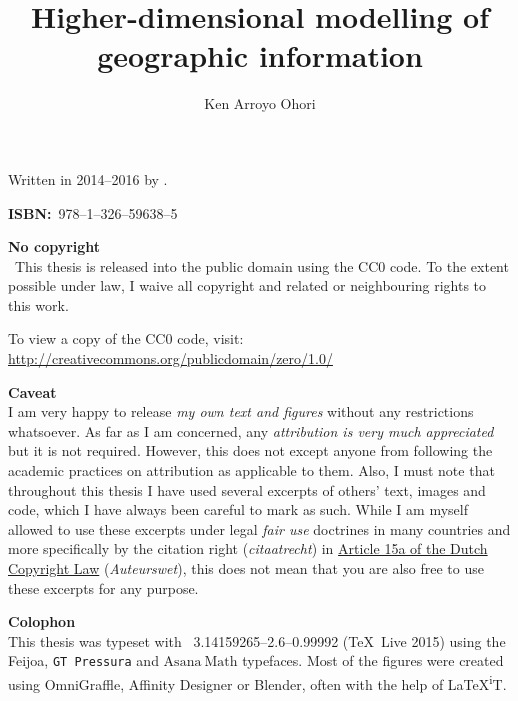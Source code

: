
% 

\author{Ken Arroyo Ohori}
\title{Higher-dimensional modelling of geographic information}
\date{}
\maketitle

\clearpage
\thispagestyle{empty}
\null%
\label{thesis:colophon}
\vfill
{}
Written in 2014--2016 by
{\makeatletter
\href{http://ken.mx}{\@author}%
\makeatother}.

\textbf{ISBN:}\ 978--1--326--59638--5

\textbf{No copyright}\\
\cczero\ This thesis is released into the public domain using the CC0 code.
To the extent possible under law, I waive all copyright and related or neighbouring rights to this work.

To view a copy of the CC0 code, visit: \\
\url{http://creativecommons.org/publicdomain/zero/1.0/}

\textbf{Caveat} \\
I am very happy to release \emph{my own text and figures} without any restrictions whatsoever.
As far as I am concerned, any \emph{attribution is very much appreciated} but it is not required.
However, this does not except anyone from following the academic practices on attribution as applicable to them.
Also, I must note that throughout this thesis I have used several excerpts of others' text, images and code, which I have always been careful to mark as such.
While I am myself allowed to use these excerpts under legal \emph{fair use} doctrines in many countries and more specifically by the citation right (\emph{citaatrecht}) in \href{http://wetten.overheid.nl/jci1.3:c:BWBR0001886&hoofdstuk=I&paragraaf=6&artikel=15a&z=2015-07-01&g=2015-07-01}{Article 15a of the Dutch Copyright Law} (\emph{Auteurswet}), this does not mean that you are also free to use these excerpts for any purpose.

\textbf{Colophon} \\
This thesis was typeset with \XeTeX\ 3.14159265--2.6--0.99992 (\TeX\ Live 2015) using the \mbox{{\fanciestfont{}Feijoa}}, \texttt{GT Pressura} and $\mathrm{Asana\ Math}$ typefaces.
Most of the figures were created using OmniGraffle, Affinity Designer or Blender, often with the help of \LaTeX{}\textsuperscript{i}T.

